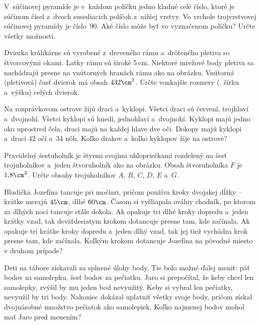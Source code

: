 {%
V~súčinovej pyramíde je v~každom políčku jedno kladné celé číslo, ktoré je súčinom čísel z~dvoch susediacich políčok z~nižšej vrstvy.
Vo vrchole trojvrstvovej súčinovej pyramídy je číslo~90.
Aké číslo môže byť vo vyznačenom políčku?
Určte všetky možnosti.
\ifobrazkyvedla\else{}\fi%
}

{%
Dvierka králikárne sú vyrobené z~dreveného rámu a~drôteného pletiva so štvorcovými okami.
Latky rámu sú široké 5\,cm.
Niektoré mrežové body pletiva sa nachádzajú presne na vnútorných hranách rámu ako na obrázku.
Vnútorná (pletivová) časť dvierok má obsah $432\cm^2$.
Určte vonkajšie rozmery (\tj. šírku a~výšku) celých dvierok.
\ifobrazkyvedla\else{}\fi%
}

{%
Na rozprávkovom ostrove žijú draci a~kyklopi.
Všetci draci sú červení, trojhlaví a~dvojnohí.
Všetci kyklopi sú hnedí, jednohlaví a~dvojnohí.
Kyklopi majú jedno oko uprostred čela, draci majú na každej hlave dve oči.
Dokopy majú kyklopi a~draci 42 očí a~34 nôh.
Koľko drakov a~koľko kyklopov žije na ostrove?
}

{%
Pravidelný šesťuholník je štyrmi svojimi uhlopriečkami rozdelený na šesť trojuholníkov a~jeden štvoruholník ako na obrázku.
Obsah štvoruholníka $F$ je $1{,}8\cm^2$.
Určte obsahy trojuholníkov $A$, $B$, $C$, $D$, $E$ a~$G$.
\ifobrazkyvedla\else{}\fi%
}

{%
Bludička Jozefína tancuje pri močiari, pričom používa kroky dvojakej dĺžky -- krátke merajú $45\cm$, dlhé $60\cm$.
Časom si vyšliapala oválny chodník, po ktorom za dlhých nocí tancuje stále dokola.
Ak opakuje tri dlhé kroky dopredu a~jeden krátky vzad, tak deväťdesiatym krokom dotancuje presne tam, kde začínala.
Ak opakuje tri krátke kroky dopredu a~jeden dlhý vzad, tak jej tiež vychádza krok presne tam, kde začínala.
Koľkým krokom dotancuje Jozefína na pôvodné miesto v druhom prípade?
}

{%
Deti na tábore získavali za splnené úlohy body.
Tie bolo možné ďalej meniť: päť bodov za samolepku, šesť bodov za pečiatku.
Jaro si prepočítal, že keby chcel len samolepky, zvýšil by mu jeden bod nevyužitý.
Keby si vybral len pečiatky, nevyužil by tri body.
Nakoniec dokázal uplatniť všetky svoje body, pričom získal dvojnásobné množstvo pečiatok ako samolepiek.
Koľko najmenej bodov mohol mať Jaro pred menením?
}

